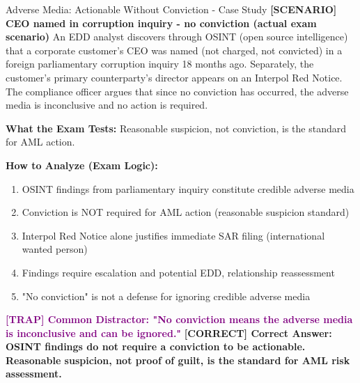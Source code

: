 \documentclass[11pt,a4paper]{beamer}
\newcommand{\trap}[1]{\textcolor{purple}{\textbf{[TRAP] #1}}}
\newcommand{\correct}[1]{\textcolor{green!50!black}{\textbf{[CORRECT] #1}}}
\newcommand{\scenario}[1]{\textcolor{blue!70!black}{\textbf{[SCENARIO] #1}}}
\begin{document}
\begin{frame}{Adverse Media: Actionable Without Conviction - Case Study}
	\scenario{CEO named in corruption inquiry - no conviction (actual exam scenario)}
	An EDD analyst discovers through OSINT (open source intelligence) that a corporate customer's CEO was named (not charged, not convicted) in a foreign parliamentary corruption inquiry 18 months ago. Separately, the customer's primary counterparty's director appears on an Interpol Red Notice. The compliance officer argues that since no conviction has occurred, the adverse media is inconclusive and no action is required.
	
	\vspace{0.1cm}
	\textbf{What the Exam Tests:} Reasonable suspicion, not conviction, is the standard for AML action.
	
	\vspace{0.1cm}
	\textbf{How to Analyze (Exam Logic):}
	\begin{enumerate}
		\item OSINT findings from parliamentary inquiry constitute credible adverse media
		\item Conviction is NOT required for AML action (reasonable suspicion standard)
		\item Interpol Red Notice alone justifies immediate SAR filing (international wanted person)
		\item Findings require escalation and potential EDD, relationship reassessment
		\item "No conviction" is not a defense for ignoring credible adverse media
	\end{enumerate}
	
	\trap{Common Distractor: "No conviction means the adverse media is inconclusive and can be ignored."}
	\correct{Correct Answer: OSINT findings do not require a conviction to be actionable. Reasonable suspicion, not proof of guilt, is the standard for AML risk assessment.}
\end{frame}
\end{document}
